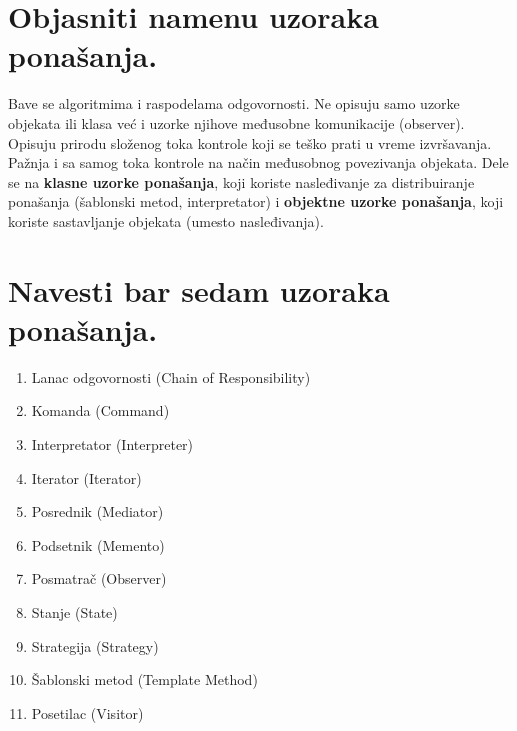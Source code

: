 \documentclass[a4paper]{article}
\begin{document}
\section{Objasniti namenu uzoraka ponašanja.}
  Bave se algoritmima i raspodelama odgovornosti. Ne opisuju samo uzorke objekata ili klasa
  već i uzorke njihove međusobne komunikacije (observer). Opisuju prirodu složenog toka kontrole
  koji se teško prati u vreme izvršavanja. Pažnja i sa samog toka kontrole na način međusobnog
  povezivanja objekata. Dele se na \textbf{klasne uzorke ponašanja}, koji koriste nasleđivanje
  za distribuiranje ponašanja (šablonski metod, interpretator) i \textbf{objektne uzorke ponašanja},
  koji koriste sastavljanje objekata (umesto nasleđivanja).

\section{Navesti bar sedam uzoraka ponašanja.}
  \begin{enumerate}
    \item Lanac odgovornosti (Chain of Responsibility)
    \item Komanda (Command)
    \item Interpretator (Interpreter)
    \item Iterator (Iterator)
    \item Posrednik (Mediator)
    \item Podsetnik (Memento)
    \item Posmatrač (Observer)
    \item Stanje (State)
    \item Strategija (Strategy)
    \item Šablonski metod (Template Method)
    \item Posetilac (Visitor)
  \end{enumerate}
\end{document}
